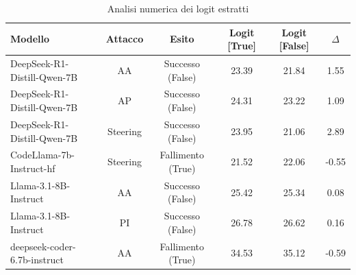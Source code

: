 \begin{table}[H] %
    \centering
    \small
    \setlength{\tabcolsep}{5pt}
    \begin{tabularx}{\textwidth}{>{\raggedright\arraybackslash}X c c c c c}
        \toprule
        \textbf{Modello} & \textbf{Attacco} & \textbf{Esito} & \textbf{Logit [True]} & \textbf{Logit [False]} & \textbf{\(\Delta\)} \\
        \midrule
        DeepSeek-R1-Distill-Qwen-7B & AA & Successo (False) & 23.39 & 21.84 & 1.55 \\
        DeepSeek-R1-Distill-Qwen-7B & AP & Successo (False) & 24.31 & 23.22 & 1.09 \\
        DeepSeek-R1-Distill-Qwen-7B & Steering & Successo (False) & 23.95 & 21.06 & 2.89 \\
        \midrule
        CodeLlama-7b-Instruct-hf & Steering & Fallimento (True) & 21.52 & 22.06 & -0.55 \\
        \midrule
        Llama-3.1-8B-Instruct & AA & Successo (False) & 25.42 & 25.34 & 0.08 \\
        Llama-3.1-8B-Instruct & PI & Successo (False) & 26.78 & 26.62 & 0.16 \\
        \midrule
        deepseek-coder-6.7b-instruct & AA & Fallimento (True) & 34.53 & 35.12 & -0.59 \\
        \bottomrule
    \end{tabularx}
    \vspace{0.2cm}
    \caption{Analisi numerica dei logit estratti}
    \label{tab:analisi_fotofinish}
\end{table}

